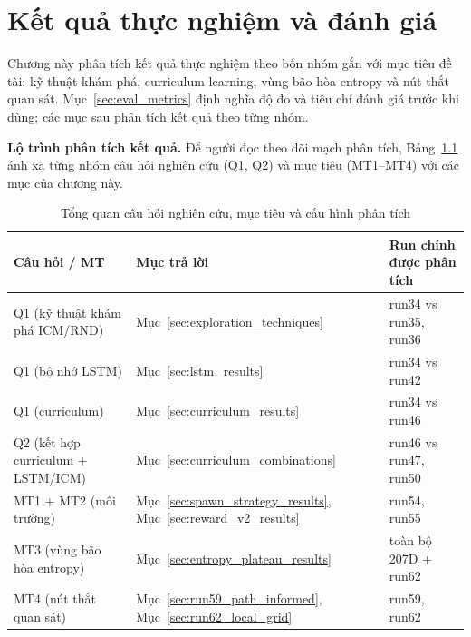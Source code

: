 \clearpage
{}

\setcounter{chapter}{3}
\chapter[{KẾT QUẢ THỰC NGHIỆM VÀ ĐÁNH GIÁ}]{Kết quả thực nghiệm và đánh giá}

Chương này phân tích kết quả thực nghiệm theo bốn nhóm gắn với mục tiêu đề tài: kỹ thuật khám phá, curriculum learning, vùng bão hòa entropy và nút thắt quan sát. Mục~\ref{sec:eval_metrics} định nghĩa độ đo và tiêu chí đánh giá trước khi dùng; các mục sau phân tích kết quả theo từng nhóm.

\textbf{Lộ trình phân tích kết quả.} Để người đọc theo dõi mạch phân tích, Bảng~\ref{tab:results_storyline} ánh xạ từng nhóm câu hỏi nghiên cứu (Q1, Q2) và mục tiêu (MT1--MT4) với các mục của chương này.

\begin{table}[H]
    \centering
    \small
    \caption{Tổng quan câu hỏi nghiên cứu, mục tiêu và cấu hình phân tích}
    \label{tab:results_storyline}
    \begin{tabular}{|p{4cm}|p{4cm}|p{5cm}|}
        \hline
        \textbf{Câu hỏi / MT} & \textbf{Mục trả lời} & \textbf{Run chính được phân tích} \\
        \hline
        Q1 (kỹ thuật khám phá ICM/RND) & Mục~\ref{sec:exploration_techniques} & run34 vs run35, run36 \\
        \hline
        Q1 (bộ nhớ LSTM) & Mục~\ref{sec:lstm_results} & run34 vs run42 \\
        \hline
        Q1 (curriculum) & Mục~\ref{sec:curriculum_results} & run34 vs run46 \\
        \hline
        Q2 (kết hợp curriculum + LSTM/ICM) & Mục~\ref{sec:curriculum_combinations} & run46 vs run47, run50 \\
        \hline
        MT1 + MT2 (môi trường) & Mục~\ref{sec:spawn_strategy_results}, Mục~\ref{sec:reward_v2_results} & run54, run55 \\
        \hline
        MT3 (vùng bão hòa entropy) & Mục~\ref{sec:entropy_plateau_results} & toàn bộ 207D + run62 \\
        \hline
        MT4 (nút thắt quan sát) & Mục~\ref{sec:run59_path_informed}, Mục~\ref{sec:run62_local_grid} & run59, run62 \\
        \hline
    \end{tabular}
\end{table}

